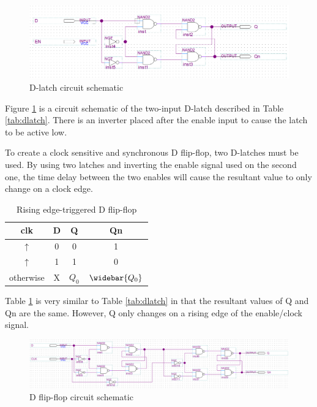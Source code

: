 \documentclass[CMPE]{KGCOEReport}
\begin{document}
\begin{figure}[h!]
	\centering
	\includegraphics[width=\textwidth]{schematic1}
	\caption{D-latch circuit schematic}
	\label{fig:dlatch-schem}
\end{figure}

Figure \ref{fig:dlatch-schem} is a circuit schematic of the two-input D-latch described in Table \ref{tab:dlatch}. There is an inverter placed after the enable input to cause the latch to be active low.

To create a clock sensitive and synchronous D flip-flop, two D-latches must be used. By using two latches and inverting the enable signal used on the second one, the time delay between the two enables will cause the resultant value to only change on a clock edge.

\begin{table}[h!]
\renewcommand{\arraystretch}{1.2}
\setlength{\tabcolsep}{12pt}
\caption{Rising edge-triggered D flip-flop}
\begin{center}
\begin{tabular}{|c|c||c|c|}
\hline
clk & D & Q & Qn\\\hline
$\uparrow$ & 0 & 0 & 1\\\hline
$\uparrow$ & 1 & 1 & 0\\\hline
otherwise  & X & $Q_0$ & $\widebar{Q_0}$\\\hline

\end{tabular}
\end{center}
\label{tab:dflipflop}
\end{table}

Table \ref{tab:dflipflop} is very similar to Table \ref{tab:dlatch} in that the resultant values of Q and Qn are the same. However, Q only changes on a rising edge of the enable/clock signal.

\begin{figure}[h!]
	\centering
	\includegraphics[width=\textwidth]{schematic2}
	\caption{D flip-flop circuit schematic}
	\label{fig:dflipflop-schem}
\end{figure}
\end{document}
